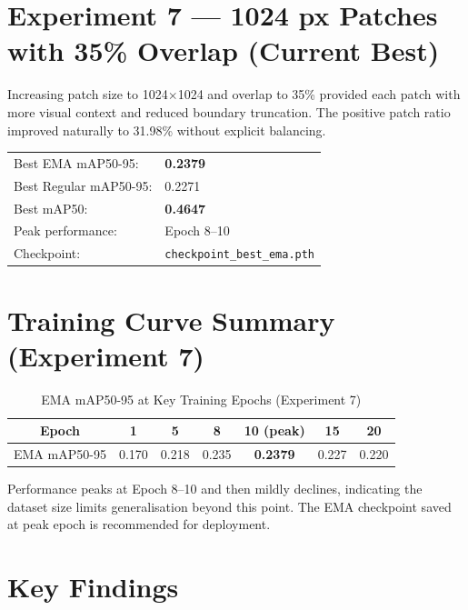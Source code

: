 \section*{Experiment 7 --- 1024 px Patches with 35\% Overlap (Current Best)}

Increasing patch size to 1024$\times$1024 and overlap to 35\% provided each patch with more visual context and reduced boundary truncation. The positive patch ratio improved naturally to 31.98\% without explicit balancing.

\begin{resultbox}
\begin{tabular}{ll}
Best EMA mAP50-95:     & \textbf{0.2379} \\
Best Regular mAP50-95: & 0.2271 \\
Best mAP50:            & \textbf{0.4647} \\
Peak performance:      & Epoch 8--10 \\
Checkpoint:            & \texttt{checkpoint\_best\_ema.pth} \\
\end{tabular}
\end{resultbox}

\section*{Training Curve Summary (Experiment 7)}

\begin{table}[H]
\centering
\caption{EMA mAP50-95 at Key Training Epochs (Experiment 7)}
\begin{tabular}{ccccccc}
\toprule
\rowcolor{tableHeader}
{\color{white}\bfseries Epoch} &
{\color{white}\bfseries 1} &
{\color{white}\bfseries 5} &
{\color{white}\bfseries 8} &
{\color{white}\bfseries 10 (peak)} &
{\color{white}\bfseries 15} &
{\color{white}\bfseries 20} \\
\midrule
EMA mAP50-95 & 0.170 & 0.218 & 0.235 & \textbf{0.2379} & 0.227 & 0.220 \\
\bottomrule
\end{tabular}
\end{table}

Performance peaks at Epoch 8--10 and then mildly declines, indicating the dataset size limits generalisation beyond this point. The EMA checkpoint saved at peak epoch is recommended for deployment.

\section*{Key Findings}

